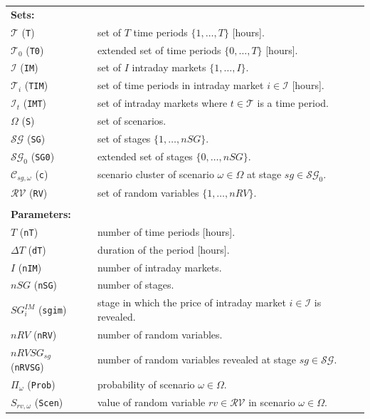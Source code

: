 \begin{tabularx}{\textwidth}{l X}
    \textbf{Sets:} \\
    $\mathcal{T}$ (\texttt{T}) & set of $T$ time periods $\{ 1, \dots, T \}$ [hours]. \\
    $\mathcal{T}_0$ (\texttt{T0}) & extended set of time periods $\{ 0, \dots, T \}$ [hours]. \\     
    $\mathcal{I}$ (\texttt{IM}) & set of $I$ intraday markets $\{1, \dots, I \}$. \\    
    $\mathcal{T}_i$ (\texttt{TIM}) & set of time periods in intraday market $i \in \mathcal{I}$ [hours]. \\
    $\mathcal{I}_t$ (\texttt{IMT}) & set of intraday markets where $t \in \mathcal{T}$ is a time period. \\    
    $\Omega$ (\texttt{S}) & set of scenarios. \\
    $\mathcal{SG}$ (\texttt{SG}) & set of stages $\{1, \dots, nSG \}$. \\
    $\mathcal{SG}_0$ (\texttt{SG0}) & extended set of stages $\{0, \dots, nSG \}$. \\     
    $\mathcal{C}_{sg, \omega}$ (\texttt{c}) & scenario cluster of scenario $\omega \in \Omega$ at stage $sg \in \mathcal{SG}_0$. \\
    $\mathcal{RV}$ (\texttt{RV}) & set of random variables $\{1, \dots, nRV \}$. \\
    \\
   
    \textbf{Parameters:} \\
    $T$ (\texttt{nT}) & number of time periods [hours]. \\ 
    $\Delta T$ (\texttt{dT}) & duration of the period [hours]. \\
    $I$ (\texttt{nIM}) & number of intraday markets. \\
    $nSG$ (\texttt{nSG}) & number of stages. \\
    $SG^{IM}_i$ (\texttt{sgim}) & stage in which the price of intraday market $i \in \mathcal{I}$ is revealed. \\
    $nRV$ (\texttt{nRV}) & number of random variables. \\
    $nRVSG_{sg}$ (\texttt{nRVSG}) & number of random variables revealed at stage $sg \in \mathcal{SG}$. \\
    $\Pi_{\omega}$ (\texttt{Prob}) & probability of scenario $\omega \in \Omega$. \\
    $S_{rv, \omega}$ (\texttt{Scen}) & value of random variable $rv \in \mathcal{RV}$ in scenario $\omega \in \Omega$. \\    
       
\end{tabularx}

